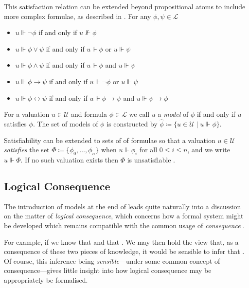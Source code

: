 This satisfaction relation can be extended beyond propositional atoms to include more complex formulae, as described in . For any $\phi, \psi \in \mathcal{L}$ 

\begin{itemize}
  \item $u \Vdash \neg \phi$ if and only if $u \nVdash \phi$
  \item $u \Vdash \phi \vee \psi$ if and only if $u \Vdash \phi$ or $u \Vdash \psi$
  \item $u \Vdash \phi \wedge \psi$ if and only if $u \Vdash \phi$ and $u \Vdash \psi$
  \item $u \Vdash \phi \rightarrow \psi$ if and only if $u \Vdash \neg \phi$ or $u \Vdash \psi$
  \item $u \Vdash \phi \leftrightarrow \psi$ if and only if $u \Vdash \phi \rightarrow \psi$ and $u \Vdash \psi \rightarrow \phi$
\end{itemize}

\begin{definition} 
  \label{definition:model}
  For a valuation $u \in \mathcal{U}$ and formula $\phi \in \mathcal{L}$ we call $u$ a \textit{model} of $\phi$ if and only if $u$ satisfies $\phi$. The set of models of $\phi$ is constructed by $\hat{\phi} \coloneqq \{u \in \mathcal{U} \mid u \Vdash \phi \}$.
\end{definition}

Satisfiability can be extended to sets of of formulae so that a valuation $u \in \mathcal{U}$ \textit{satisfies} the set $\Phi \coloneqq \{\phi_0, \ldots, \phi_n \}$ when $u \Vdash \phi_i$ for all $0 \leq i \leq n$, and we write $u \Vdash \Phi$. If no such valuation exists then $\Phi$ is unsatisfiable \cite[p. 31]{Ben1993Mathematical}. 

\subsection{Logical Consequence}
\label{subsection:logical-consequence}

The introduction of models at the end of  leads quite naturally into a discussion on the matter of \textit{logical consequence}, which concerns how a formal system might be developed which remains compatible with the common usage of \textit{consequence} \cite[p. 408]{turquette1957logic}.  

For example, if we know that  and that . We may then hold the view that, as a consequence of these two pieces of knowledge, it would be sensible to infer that . Of course, this inference being \textit{sensible}---under some common concept of consequence---gives little insight into how logical consequence may be appropriately be formalised. 

